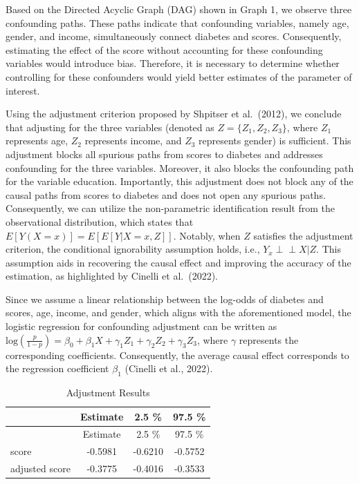 \documentclass[
  12pt,
]{article}
\begin{document}
Based on the Directed Acyclic Graph (DAG) shown in Graph 1, we observe
three confounding paths. These paths indicate that confounding
variables, namely age, gender, and income, simultaneously connect
diabetes and scores. Consequently, estimating the effect of the score
without accounting for these confounding variables would introduce bias.
Therefore, it is necessary to determine whether controlling for these
confounders would yield better estimates of the parameter of interest.

Using the adjustment criterion proposed by Shpitser et al.~(2012), we
conclude that adjusting for the three variables (denoted as
\(Z=\{Z_1, Z_2, Z_3\}\), where \(Z_1\) represents age, \(Z_2\)
represents income, and \(Z_3\) represents gender) is sufficient. This
adjustment blocks all spurious paths from scores to diabetes and
addresses confounding for the three variables. Moreover, it also blocks
the confounding path for the variable education. Importantly, this
adjustment does not block any of the causal paths from scores to
diabetes and does not open any spurious paths. Consequently, we can
utilize the non-parametric identification result from the observational
distribution, which states that \(E[Y(X=x)] = E[E[Y|X=x,Z]]\). Notably,
when \(Z\) satisfies the adjustment criterion, the conditional
ignorability assumption holds, i.e., \(Y_x \perp\!\!\!\perp X |Z\). This
assumption aids in recovering the causal effect and improving the
accuracy of the estimation, as highlighted by Cinelli et al.~(2022).

Since we assume a linear relationship between the log-odds of diabetes
and scores, age, income, and gender, which aligns with the
aforementioned model, the logistic regression for confounding adjustment
can be written as
\(\text{log}(\frac{p}{1-p}) = \beta_0 + \beta_1 X + \gamma_1 Z_1 + \gamma_2 Z_2 + \gamma_3 Z_3\),
where \(\gamma\) represents the corresponding coefficients.
Consequently, the average causal effect corresponds to the regression
coefficient \(\beta_1\) (Cinelli et al., 2022).

\begin{longtable}[]{@{}lccc@{}}
\caption{Adjustment Results}\tabularnewline
\toprule()
& Estimate & 2.5 \% & 97.5 \% \\
\midrule()
\endfirsthead
\toprule()
& Estimate & 2.5 \% & 97.5 \% \\
\midrule()
\endhead
score & -0.5981 & -0.6210 & -0.5752 \\
adjusted score & -0.3775 & -0.4016 & -0.3533 \\
\bottomrule()
\end{longtable}
\end{document}
